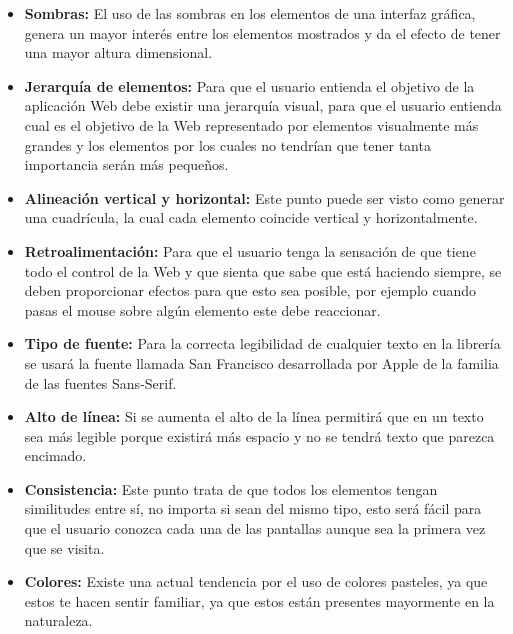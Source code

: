 \begin{itemize}
\item \textbf{Sombras:} El uso de las sombras en los elementos de una interfaz gráfica, genera un mayor interés entre los elementos mostrados y da el efecto de tener una mayor altura dimensional.
\item \textbf{Jerarquía de elementos:} Para que el usuario entienda el objetivo de la aplicación Web debe existir una jerarquía visual, para que el usuario entienda cual es el objetivo de la Web representado por elementos visualmente más grandes y los elementos por los cuales no tendrían que tener tanta importancia serán más pequeños.
\item \textbf{Alineación vertical y horizontal:} Este punto puede ser visto como generar una cuadrícula, la cual cada elemento coincide vertical y horizontalmente.
\item \textbf{Retroalimentación:} Para que el usuario tenga la sensación de que tiene todo el control de la Web y que sienta que sabe que está haciendo siempre, se deben proporcionar efectos para que esto sea posible, por ejemplo cuando pasas el mouse sobre algún elemento este debe reaccionar.
\item \textbf{Tipo de fuente:} Para la correcta legibilidad de cualquier texto en la librería se usará la fuente llamada San Francisco desarrollada por Apple de la familia de las fuentes Sans-Serif.
\item \textbf{Alto de línea:} Si se aumenta el alto de la línea permitirá que en un texto sea más legible porque existirá más espacio y no se tendrá texto que parezca encimado.
\item \textbf{Consistencia:} Este punto trata de que todos los elementos tengan similitudes entre sí, no importa si sean del mismo tipo, esto será fácil para que el usuario conozca cada una de las pantallas aunque sea la primera vez que se visita. 
\item \textbf{Colores:} Existe una actual tendencia por el uso de colores pasteles, ya que estos te hacen sentir familiar, ya que estos están presentes mayormente en la naturaleza.
\end{itemize}
